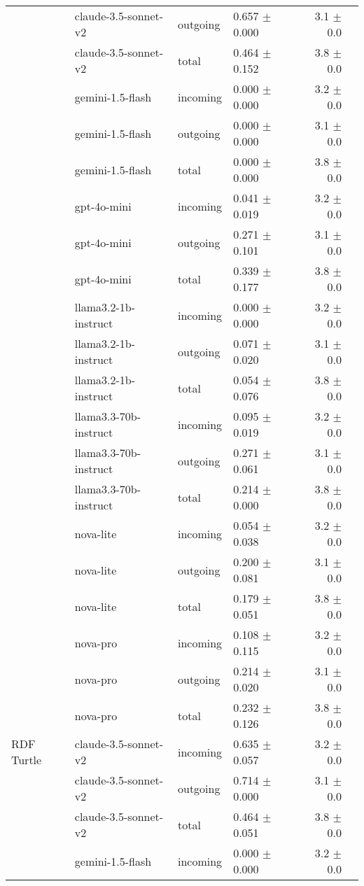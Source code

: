\begin{table}[ht]
\begin{tabular}{llllrr}
 & claude-3.5-sonnet-v2 & outgoing & 0.657 $\pm$ 0.000 & 3.1 $\pm$ 0.0 \\
 & claude-3.5-sonnet-v2 & total & 0.464 $\pm$ 0.152 & 3.8 $\pm$ 0.0 \\
 & gemini-1.5-flash & incoming & 0.000 $\pm$ 0.000 & 3.2 $\pm$ 0.0 \\
 & gemini-1.5-flash & outgoing & 0.000 $\pm$ 0.000 & 3.1 $\pm$ 0.0 \\
 & gemini-1.5-flash & total & 0.000 $\pm$ 0.000 & 3.8 $\pm$ 0.0 \\
 & gpt-4o-mini & incoming & 0.041 $\pm$ 0.019 & 3.2 $\pm$ 0.0 \\
 & gpt-4o-mini & outgoing & 0.271 $\pm$ 0.101 & 3.1 $\pm$ 0.0 \\
 & gpt-4o-mini & total & 0.339 $\pm$ 0.177 & 3.8 $\pm$ 0.0 \\
 & llama3.2-1b-instruct & incoming & 0.000 $\pm$ 0.000 & 3.2 $\pm$ 0.0 \\
 & llama3.2-1b-instruct & outgoing & 0.071 $\pm$ 0.020 & 3.1 $\pm$ 0.0 \\
 & llama3.2-1b-instruct & total & 0.054 $\pm$ 0.076 & 3.8 $\pm$ 0.0 \\
 & llama3.3-70b-instruct & incoming & 0.095 $\pm$ 0.019 & 3.2 $\pm$ 0.0 \\
 & llama3.3-70b-instruct & outgoing & 0.271 $\pm$ 0.061 & 3.1 $\pm$ 0.0 \\
 & llama3.3-70b-instruct & total & 0.214 $\pm$ 0.000 & 3.8 $\pm$ 0.0 \\
 & nova-lite & incoming & 0.054 $\pm$ 0.038 & 3.2 $\pm$ 0.0 \\
 & nova-lite & outgoing & 0.200 $\pm$ 0.081 & 3.1 $\pm$ 0.0 \\
 & nova-lite & total & 0.179 $\pm$ 0.051 & 3.8 $\pm$ 0.0 \\
 & nova-pro & incoming & 0.108 $\pm$ 0.115 & 3.2 $\pm$ 0.0 \\
 & nova-pro & outgoing & 0.214 $\pm$ 0.020 & 3.1 $\pm$ 0.0 \\
 & nova-pro & total & 0.232 $\pm$ 0.126 & 3.8 $\pm$ 0.0 \\
\midrule
RDF Turtle & claude-3.5-sonnet-v2 & incoming & 0.635 $\pm$ 0.057 & 3.2 $\pm$ 0.0 \\
 & claude-3.5-sonnet-v2 & outgoing & 0.714 $\pm$ 0.000 & 3.1 $\pm$ 0.0 \\
 & claude-3.5-sonnet-v2 & total & 0.464 $\pm$ 0.051 & 3.8 $\pm$ 0.0 \\
 & gemini-1.5-flash & incoming & 0.000 $\pm$ 0.000 & 3.2 $\pm$ 0.0 \\

\end{tabular}
\end{table}
